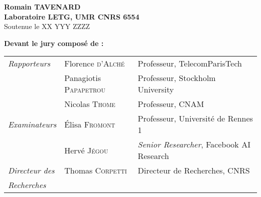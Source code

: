 \begin{titlepage}
\begin{center}
\vspace{-1cm}
\noindent {\large \textbf{}} \\
\vspace*{.2cm}
 \\
 \\
\vspace*{.8cm}
\\

\vspace*{1.5cm}

\sffamily

 \\
 \vspace*{0.8cm}

\vspace*{1.5cm}
\noindent \LARGE  \textbf{ Romain T{\Large AVENARD}} \\
\vspace*{1cm}\rmfamily
 \noindent \large \textbf{  Laboratoire LETG, UMR CNRS 6554 } \\
 \vspace*{2cm}
 \noindent \large Soutenue le XX YYY ZZZZ \\
 \vspace*{1cm}
\end{center}
\noindent \large \textbf{Devant le jury composé de :} \\
\begin{center}
\noindent \large
\begin{tabular}{lll}
      \textit{Rapporteurs}	& Florence {\scshape d'Alché} & Professeur, TelecomParisTech\\
                                & Panagiotis {\scshape Papapetrou} & Professeur, Stockholm University\\
                                & Nicolas {\scshape Thome} & Professeur, CNAM\\
      \textit{Examinateurs}     & Élisa {\scshape Fromont} & Professeur, Université de Rennes 1\\
                                & Hervé {\scshape Jégou} & \emph{Senior Researcher}, Facebook AI Research\\
      \textit{Directeur des}    & Thomas {\scshape Corpetti} & Directeur de Recherches, CNRS \\
      \textit{Recherches}    & & \\


\end{tabular}
\end{center}
\end{titlepage}
